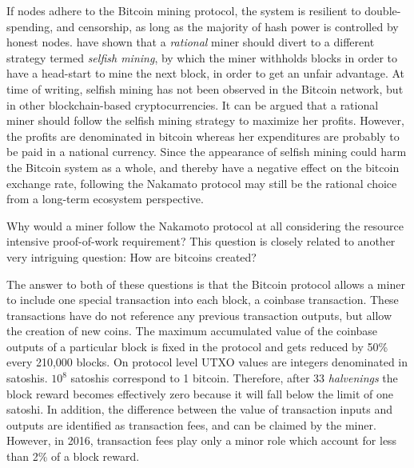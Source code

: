 If nodes adhere to the Bitcoin mining protocol, the system is resilient to double-spending, and censorship, as long as the majority of hash power is controlled by honest nodes. \cite{Eyal2014} have shown that a \emph{rational} miner should divert to a different strategy termed \emph{selfish mining}, by which the miner withholds blocks in order to have a head-start to mine the next block, in order to get an unfair advantage. At time of writing, selfish mining has not been observed in the Bitcoin network, but in other blockchain-based cryptocurrencies. It can be argued that a rational miner should follow the selfish mining strategy to maximize her profits. However, the profits are denominated in bitcoin whereas her expenditures are probably to be paid in a national currency. Since the appearance of selfish mining could harm the Bitcoin system as a whole, and thereby have a negative effect on the bitcoin exchange rate, following the Nakamato protocol may still be the rational choice from a long-term ecosystem perspective. 


Why would a miner follow the Nakamoto protocol at all considering the resource intensive proof-of-work requirement? This question is closely related to another very intriguing question: How are bitcoins created?

The answer to both of these questions is that the Bitcoin protocol allows a miner to include one special transaction into each block, a coinbase transaction. These transactions have do not reference any previous transaction outputs, but allow the creation of new coins. The maximum accumulated value of the coinbase outputs of a particular block is fixed in the protocol and gets reduced by 50\% every 210,000 blocks. On protocol level UTXO values are integers denominated in satoshis. $10^8$ satoshis correspond to 1 bitcoin. Therefore, after 33 \emph{halvenings} the block reward becomes effectively zero because it will fall below the limit of one satoshi. In addition, the difference between the value of transaction inputs and outputs are identified as transaction fees, and can be claimed by the miner. However, in 2016, transaction fees play only a minor role which account for less than 2\% of a block reward.

